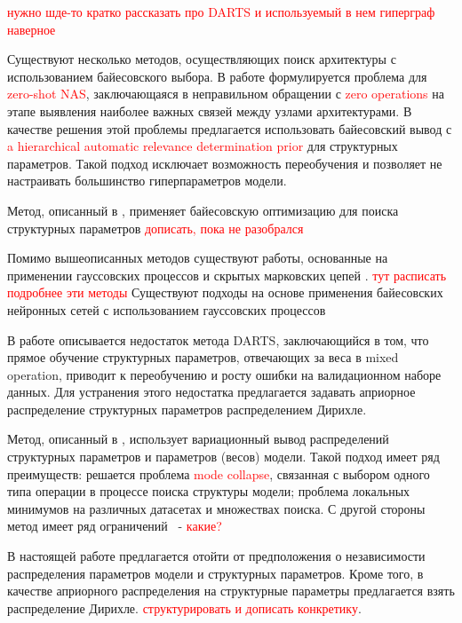 \documentclass[12pt, twoside]{article}
\begin{document}
\textcolor{red}{нужно шде-то кратко рассказать про DARTS и используемый в нем гиперграф наверное}

Существуют несколько методов, осуществляющих поиск архитектуры с использованием байесовского выбора. В работе \cite{zhou2019bayesnas} формулируется проблема для \textcolor{red}{zero-shot NAS}, заключающаяся в неправильном обращении с \textcolor{red}{zero operations} на этапе выявления наиболее важных связей между узлами архитектурами. В качестве решения этой проблемы предлагается использовать байесовский вывод с \textcolor{red}{a hierarchical automatic
relevance determination prior} для структурных параметров. Такой подход исключает возможность переобучения и позволяет не настраивать большинство гиперпараметров модели.

Метод, описанный в \cite{DBLP:journals/corr/abs-1910-11858}, применяет байесовскую оптимизацию для поиска структурных параметров \textcolor{red}{дописать, пока не разобрался}


Помимо вышеописанных методов существуют работы, основанные на применении гауссовских процессов \cite{inproceedings, DBLP:journals/corr/abs-2011-06006} и скрытых марковских цепей \cite{DBLP:journals/corr/abs-2007-16149}. \textcolor{red}{тут расписать подробнее эти методы}
Существуют подходы на основе применения байесовских нейронных сетей с использованием гауссовских процессов \cite{inproceedings, DBLP:journals/corr/abs-2011-06006}

В работе \cite{DBLP:journals/corr/abs-2006-10355} описывается недостаток метода DARTS, заключающийся в том, что прямое обучение структурных параметров, отвечающих за веса в mixed operation, приводит к переобучению и росту ошибки на валидационном наборе данных. Для устранения этого недостатка предлагается задавать априорное распределение структурных параметров распределением Дирихле.

Метод, описанный в \cite{ferianc2021vinnas}, использует вариационный вывод распределений структурных параметров и параметров (весов) модели. Такой подход имеет ряд преимуществ: решается проблема \textcolor{red}{mode collapse}, связанная с выбором одного типа операции в процессе поиска структуры модели; проблема локальных минимумов на различных датасетах и множествах поиска. С другой стороны метод имеет ряд ограничений ~- \textcolor{red}{какие?}

В настоящей работе предлагается отойти от предположения о независимости распределения параметров модели и структурных параметров. Кроме того, в качестве априорного распределения на структурные параметры предлагается взять распределение Дирихле. \textcolor{red}{структурировать и дописать конкретику}.
\end{document}
